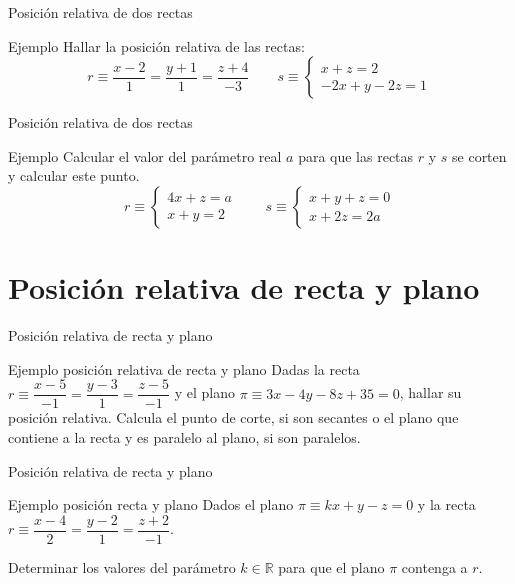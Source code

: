 \documentclass[8pt]{beamer}
\newcommand{\R}{\mathbb{R}}
\begin{document}
\begin{frame}{Posición relativa de dos rectas}
\begin{exampleblock}{Ejemplo}
Hallar la posición relativa de las rectas:
\[ r \equiv \dfrac{x-2}{1}=\dfrac{y+1}{1}=\dfrac{z+4}{-3} \qquad s \equiv \begin{cases} x+z=2 \\ -2x+y-2z = 1 \end{cases} \]
\end{exampleblock}
\end{frame}

\begin{frame}{Posición relativa de dos rectas}
\begin{exampleblock}{Ejemplo}
Calcular el valor del parámetro real $a$ para que las rectas $r$ y $s$ se corten y calcular este punto.
\[ r \equiv \begin{cases} 4x+z=a \\ x+y = 2 \end{cases} \qquad s \equiv \begin{cases} x+y+z=0 \\ x+2z = 2a \end{cases} \]
\end{exampleblock}
\end{frame}


\section{Posición relativa de recta y plano}

\begin{frame}{Posición relativa de recta y plano}
\begin{exampleblock}{Ejemplo posición relativa de recta y plano}
Dadas la recta $r \equiv \dfrac{x-5}{-1}=\dfrac{y-3}{1}=\dfrac{z-5}{-1}$ y el plano $\pi \equiv 3x-4y-8z+35=0$, hallar su posición relativa. Calcula el punto de corte, si son secantes o el plano que contiene a la recta y es paralelo al plano, si son paralelos.  
\end{exampleblock}
\end{frame}

\begin{frame}{Posición relativa de recta y plano}
\begin{exampleblock}{Ejemplo posición recta y plano}
Dados el plano $\pi \equiv  kx + y - z = 0$ y la recta $r \equiv \dfrac{x-4}{2}=\dfrac{y-2}{1}=\dfrac{z+2}{-1}$.

Determinar los valores del parámetro $k \in  \R$ para que el plano $\pi$ contenga a $r$.
\end{exampleblock}
\end{frame}
\end{document}
